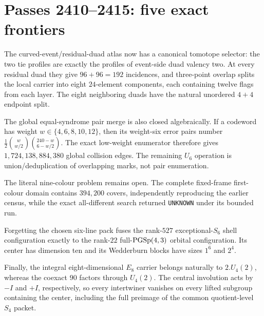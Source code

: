 \section*{Passes 2410--2415: five exact frontiers}
The curved-event/residual-duad atlas now has a canonical tomotope selector: the two tie profiles are exactly the profiles of event-side duad valency two. At every residual duad they give $96+96=192$ incidences, and three-point overlap splits the local carrier into eight $24$-element components, each containing twelve flags from each layer. The eight neighboring duads have the natural unordered $4+4$ endpoint split.

The global equal-syndrome pair merge is also closed algebraically. If a codeword has weight $w\in\{4,6,8,10,12\}$, then its weight-six error pairs number $\frac12\binom{w}{w/2}\binom{240-w}{6-w/2}$. The exact low-weight enumerator therefore gives $1{,}724{,}138{,}884{,}380$ global collision edges. The remaining $U_6$ operation is union/deduplication of overlapping marks, not pair enumeration.

The literal nine-colour problem remains open. The complete fixed-frame first-colour domain contains $394{,}200$ covers, independently reproducing the earlier census, while the exact all-different search returned \texttt{UNKNOWN} under its bounded run.

Forgetting the chosen six-line pack fuses the rank-$527$ exceptional-$S_6$ shell configuration exactly to the rank-$22$ full-$\mathrm{PGSp}(4,3)$ orbital configuration. Its center has dimension ten and its Wedderburn blocks have sizes $1^6$ and $2^4$.

Finally, the integral eight-dimensional $E_8$ carrier belongs naturally to $2.U_4(2)$, whereas the coexact $90$ factors through $U_4(2)$. The central involution acts by $-I$ and $+I$, respectively, so every intertwiner vanishes on every lifted subgroup containing the center, including the full preimage of the common quotient-level $S_4$ packet.
